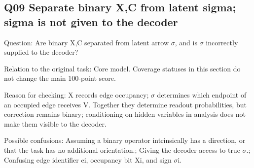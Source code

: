 \documentclass[11pt,a4paper]{article}
\begin{document}
\clearpage
\subsection{Q09 Separate binary X,\allowbreak{}C from latent sigma; sigma is not given to the decoder}
\label{aspect:Q09}
Question: Are binary X,\allowbreak{}C separated from latent arrow \ensuremath{\sigma},\allowbreak{} and is \ensuremath{\sigma} incorrectly supplied to the decoder?

Relation to the original task: Core model. Coverage statuses in this section do not change the main 100-point score.

Reason for checking: X records edge occupancy; \ensuremath{\sigma} determines which endpoint of an occupied edge receives V. Together they determine readout probabilities,\allowbreak{} but correction remains binary; conditioning on hidden variables in analysis does not make them visible to the decoder.

Possible confusions: Assuming a binary operator intrinsically has a direction,\allowbreak{} or that the task has no additional orientation.; Giving the decoder access to true \ensuremath{\sigma}.; Confusing edge identifier ei,\allowbreak{} occupancy bit Xi,\allowbreak{} and sign \ensuremath{\sigma}i.
\end{document}
